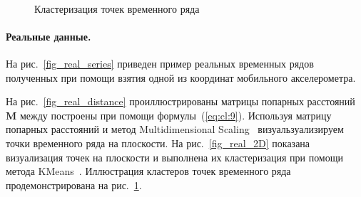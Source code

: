 \documentclass[12pt, twoside]{article}
\numberwithin{equation}{section}
\begin{document}
\begin{figure}[h!t]\center
{}
\\
\caption{Кластеризация точек временного ряда}
\label{fig_real_claster}
\end{figure}

\paragraph{Реальные данные.}

На рис.~\ref{fig_real_series} приведен пример реальных временных рядов полученных при помощи взятия одной из координат мобильного акселерометра. 



На рис.~\ref{fig_real_distance} проиллюстрированы матрицы попарных расстояний $\textbf{M}$ между построены при помощи формулы~(\ref{eq:cl:9}). Используя матрицу попарных расстояний и метод Multidimensional Scaling~\cite{Borg2005} визуальзуализируем точки временного ряда на плоскости. На рис.~\ref{fig_real_2D} показана визуализация точек на плоскости и выполнена их кластеризация при помощи метода KMeans~\cite{Kanungo2000}. Иллюстрация кластеров точек временного ряда продемонстрирована на рис.~\ref{fig_real_claster}.
\end{document}
